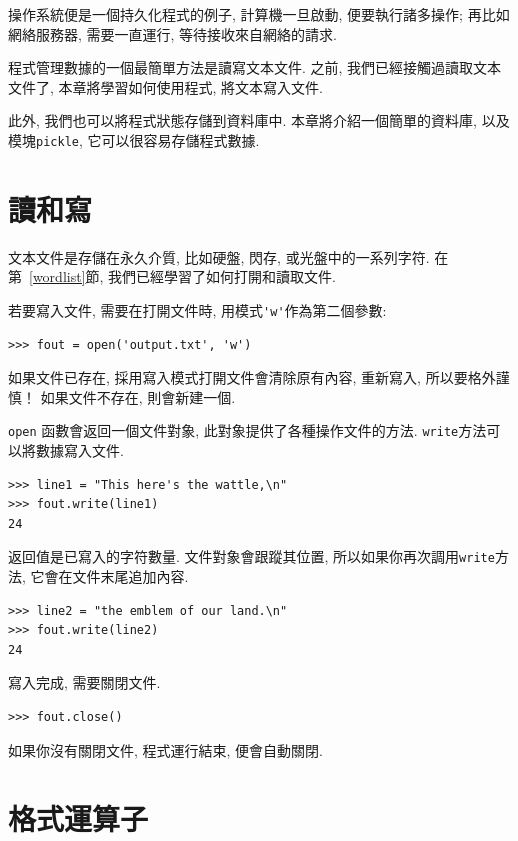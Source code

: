 \documentclass[10pt]{book}
\begin{document}
操作系統便是一個持久化程式的例子, 計算機一旦啟動, 便要執行諸多操作;
再比如網絡服務器, 需要一直運行, 等待接收來自網絡的請求. 

程式管理數據的一個最簡單方法是讀寫文本文件. 
之前, 我們已經接觸過讀取文本文件了, 
本章將學習如何使用程式, 將文本寫入文件. 

此外, 我們也可以將程式狀態存儲到資料庫中. 
本章將介紹一個簡單的資料庫, 以及模塊{\tt pickle}, 
它可以很容易存儲程式數據. 


\section{讀和寫}

文本文件是存儲在永久介質, 比如硬盤, 閃存, 或光盤中的一系列字符. 
在第~\ref{wordlist}節, 我們已經學習了如何打開和讀取文件. 

若要寫入文件, 需要在打開文件時, 用模式\verb"'w'"作為第二個參數:

\begin{verbatim}
>>> fout = open('output.txt', 'w')
\end{verbatim}
%
如果文件已存在, 採用寫入模式打開文件會清除原有內容, 重新寫入, 所以要格外謹慎！
如果文件不存在, 則會新建一個. 

{\tt open} 函數會返回一個文件對象, 此對象提供了各種操作文件的方法. 
{\tt write}方法可以將數據寫入文件. 

\begin{verbatim}
>>> line1 = "This here's the wattle,\n"
>>> fout.write(line1)
24
\end{verbatim}
%

返回值是已寫入的字符數量. 
文件對象會跟蹤其位置, 所以如果你再次調用{\tt write}方法, 
它會在文件末尾追加內容. 

\begin{verbatim}
>>> line2 = "the emblem of our land.\n"
>>> fout.write(line2)
24
\end{verbatim}
%
寫入完成, 需要關閉文件. 

\begin{verbatim}
>>> fout.close()
\end{verbatim}
%
%
如果你沒有關閉文件, 程式運行結束, 便會自動關閉. 


\section{格式運算子}
\end{document}
